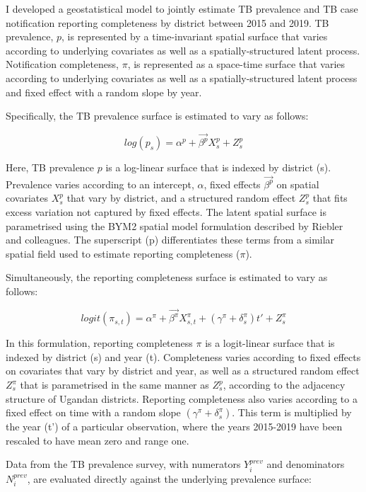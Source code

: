 \documentclass[
]{report}
\begin{document}
I developed a geostatistical model to jointly estimate TB prevalence and TB case notification reporting completeness by district between 2015 and 2019. TB prevalence, \(p\), is represented by a time-invariant spatial surface that varies according to underlying covariates as well as a spatially-structured latent process. Notification completeness, \(\pi\), is represented as a space-time surface that varies according to underlying covariates as well as a spatially-structured latent process and fixed effect with a random slope by year.

Specifically, the TB prevalence surface is estimated to vary as follows:

\[log(p_s) = \alpha^p + \overrightarrow{\beta^p}X^p_s + Z^p_s\]

Here, TB prevalence \(p\) is a log-linear surface that is indexed by district (s). Prevalence varies according to an intercept, \(\alpha\), fixed effects \(\overrightarrow{\beta^p}\) on spatial covariates \(X^p_s\) that vary by district, and a structured random effect \(Z^p_s\) that fits excess variation not captured by fixed effects. The latent spatial surface is parametrised using the BYM2 spatial model formulation described by Riebler and colleagues.\autocite{Riebler2016} The superscript (p) differentiates these terms from a similar spatial field used to estimate reporting completeness (\(\pi\)).

Simultaneously, the reporting completeness surface is estimated to vary as follows:

\[logit(\pi_{s,t}) = \alpha^\pi + \overrightarrow{\beta^\pi}X^\pi_{s,t} + (\gamma^\pi + \delta^\pi_s)t' + Z^\pi_s\]

In this formulation, reporting completeness \(\pi\) is a logit-linear surface that is indexed by district (s) and year (t). Completeness varies according to fixed effects on covariates that vary by district and year, as well as a structured random effect \(Z^\pi_s\) that is parametrised in the same manner as \(Z^p_s\), according to the adjacency structure of Ugandan districts. Reporting completeness also varies according to a fixed effect on time with a random slope \((\gamma^\pi + \delta^\pi_s)\). This term is multiplied by the year (t') of a particular observation, where the years 2015-2019 have been rescaled to have mean zero and range one.

Data from the TB prevalence survey, with numerators \(Y^{prev}_i\) and denominators \(N^{prev}_i\), are evaluated directly against the underlying prevalence surface:
\end{document}
